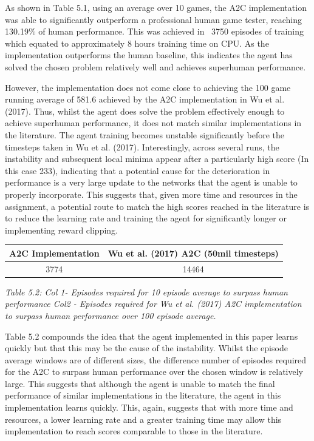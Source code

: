 \documentclass{article}
\begin{document}
As shown in Table 5.1, using an average over 10 games, the A2C implementation was able to significantly outperform a professional human game tester, reaching 130.19\% of human performance. This was achieved in ~3750 episodes of training which equated to approximately 8 hours training time on CPU. As the implementation outperforms the human baseline, this indicates the agent has solved the chosen problem relatively well and achieves superhuman performance.

However, the implementation does not come close to achieving the 100 game running average of 581.6 achieved by the A2C implementation in Wu et al. (2017). Thus, whilst the agent does solve the problem effectively enough to achieve superhuman performance, it does not match similar implementations in the literature. The agent training becomes unstable significantly before the timesteps taken in Wu et al. (2017). Interestingly, across several runs, the instability and subsequent local minima appear after a particularly high score (In this case 233), indicating that a potential cause for the deterioration in performance is a very large update to the networks that the agent is unable to properly incorporate. This suggests that, given more time and resources in the assignment, a potential route to match the high scores reached in the literature is to reduce the learning rate and training the agent for significantly longer or implementing reward clipping.

\begin{table}[h!]
\centering
\begin{tabular}{|c | c|} 
 \hline
 A2C Implementation & Wu et al. (2017) A2C (50mil timesteps) \\ [0.5ex] 
 \hline
 3774 & 14464   \\ 
 \hline
\end{tabular}
\end{table}
\emph{Table 5.2: Col 1- Episodes required for 10 episode average to surpass human performance Col2 - Episodes required for Wu et al. (2017) A2C implementation to surpass human performance over 100 episode average.}

Table 5.2 compounds the idea that the agent implemented in this paper learns quickly but that this may be the cause of the instability. Whilst the episode average windows are of different sizes, the difference number of episodes required for the A2C to surpass human performance over the chosen window is relatively large. This suggests that although the agent is unable to match the final performance of similar implementations in the literature, the agent in this implementation learns quickly. This, again, suggests that with more time and resources, a lower learning rate and a greater training time may allow this implementation to reach scores comparable to those in the literature.
\end{document}
